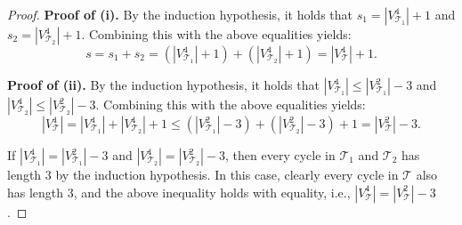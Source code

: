 \documentclass[10pt,a4paper]{amsart}
\begin{document}
\begin{proof}
            \textbf{Proof of (i).} By the induction hypothesis, it holds that $s_1=|V^4_{\mathcal{T}_1}|+1$ and $s_2=|V^4_{\mathcal{T}_2}|+1$.
            Combining this with the above equalities yields:
            $$s = s_1+s_2 = (|V^4_{\mathcal{T}_1}|+1) + (|V^4_{\mathcal{T}_2}|+1) = |V^4_{\mathcal{T}}|+1.$$
        
            \textbf{Proof of (ii).} By the induction hypothesis, it holds that $|V^4_{\mathcal{T}_1}|\leq |V^2_{\mathcal{T}_1}|-3$ and $|V^4_{\mathcal{T}_2}|\leq |V^2_{\mathcal{T}_2}|-3$. 
            Combining this with the above equalities yields:
             $$|V^4_{\mathcal{T}}| = |V^4_{\mathcal{T}_1}|+|V^4_{\mathcal{T}_2}|+1 \leq (|V^2_{\mathcal{T}_1}|-3) + (|V^2_{\mathcal{T}_2}|-3) + 1 = |V^2_{\mathcal{T}}|-3.$$
        
            If $|V^4_{\mathcal{T}_1}|= |V^2_{\mathcal{T}_1}|-3$ and $|V^4_{\mathcal{T}_2}|= |V^2_{\mathcal{T}_2}|-3$, then every cycle in $\mathcal{T}_1$ and $\mathcal{T}_2$ has length $3$ by the induction hypothesis. 
            In this case, clearly every cycle in $\mathcal{T}$ also has length $3$, and the above inequality holds with equality, i.e., $|V^4_{\mathcal{T}}|=|V^2_{\mathcal{T}}|-3$.
        \end{proof}
\end{document}
